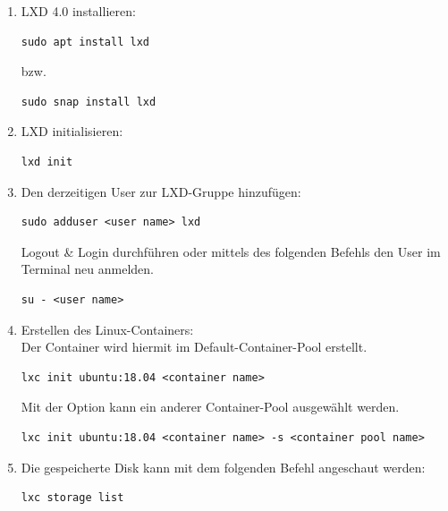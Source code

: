 \begin{enumerate}[label*=\arabic*.]
    \item LXD 4.0 installieren:\
        \begin{lstlisting}[style=bash]
sudo apt install lxd
        \end{lstlisting}
    bzw.
        \begin{lstlisting}[style=bash]
sudo snap install lxd
        \end{lstlisting}

    \item LXD initialisieren:\
        \begin{lstlisting}[style=bash]
lxd init
        \end{lstlisting}

    \item Den derzeitigen User zur LXD-Gruppe hinzufügen:\
        \begin{lstlisting}[style=bash]
sudo adduser <user name> lxd
        \end{lstlisting}
        Logout \& Login durchführen oder mittels des folgenden Befehls den User im Terminal neu anmelden.
        \begin{lstlisting}[style=bash]
su - <user name>
        \end{lstlisting}

    \item Erstellen des Linux-Containers:\\
        Der Container wird hiermit im Default-Container-Pool erstellt.
        \begin{lstlisting}[style=bash]
lxc init ubuntu:18.04 <container name>
        \end{lstlisting}
        Mit der Option \quoteMark{-s} kann ein anderer Container-Pool ausgewählt werden.
        \begin{lstlisting}[style=bash]
lxc init ubuntu:18.04 <container name> -s <container pool name>
        \end{lstlisting}

    \item Die gespeicherte Disk kann mit dem folgenden Befehl angeschaut werden:\
        \begin{lstlisting}[style=bash]
lxc storage list
        \end{lstlisting}


\end{enumerate}
